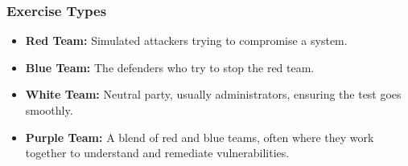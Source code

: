 \begin{fullwidth}
    \subsubsection*{\color{red}Exercise Types}
    \begin{itemize}
        \item \textbf{Red Team:} Simulated attackers trying to compromise a system.
        \item \textbf{Blue Team:} The defenders who try to stop the red team.
        \item \textbf{White Team:} Neutral party, usually administrators, ensuring the test goes smoothly.
        \item \textbf{Purple Team:} A blend of red and blue teams, often where they work together to understand and remediate vulnerabilities.
    \end{itemize}

\end{fullwidth}
\newpage